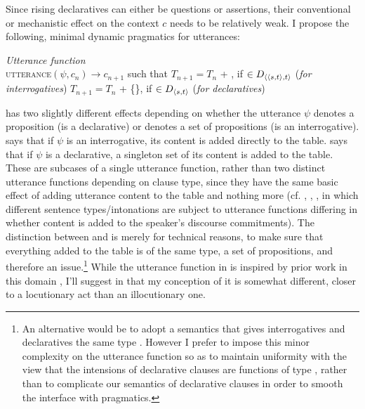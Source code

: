 \documentclass[output=paper,colorlinks,citecolor=brown]{langscibook}
\begin{document}
	Since rising declaratives can either be questions or assertions, their conventional or mechanistic effect on the context $c$ needs to be relatively weak. I propose the following, minimal dynamic pragmatics for utterances:
	
	\exa \emph{Utterance function}\label{dgUtt}\\
	\textsc{utterance}$(\psi, c_n) \rightarrow c_{n+1}$ such that
	\ea $T_{n+1} = T_n$ + , \hspace{1cm} if  $\in D_{{\langle {\langle s,t \rangle},t \rangle}}$ \label{uttI}\hfill (\emph{for interrogatives})
	\ex $T_{n+1} = T_n$ + \{\}, \hspace{.58cm} if  $\in D_{{\langle s,t \rangle}}$  \label{uttD}\hfill (\emph{for declaratives})
	\z
	\z
	
	 has two slightly different effects depending on whether the utterance $\psi$ denotes a proposition (is a declarative) or denotes a set of propositions (is an interrogative).  says that if $\psi$ is an interrogative, its content is added directly to the table.  says that if $\psi$ is a declarative, a singleton set of its content is added to the table. These are subcases of a single utterance function, rather than two distinct utterance functions depending on clause type, since they have  the same basic effect of adding utterance content to the table and nothing more (cf. \citealt{farkas10}, \citealt{jeong18}, \citealt{rudin18}, in which different sentence types/intonations are subject to utterance functions differing in whether content is added to the speaker's discourse commitments). The distinction between  and  is merely for technical reasons, to make sure that everything added to the table is of the same type, a set of propositions, and therefore an issue.\footnote{An alternative would be to adopt a semantics that gives interrogatives and declaratives the same type \citep[cf.][]{farkas17, rudin18, rudin22}. However I prefer to impose this minor complexity on the utterance function so as to maintain uniformity with the view that the intensions of declarative clauses are functions of type , rather than to complicate our semantics of declarative clauses in order to smooth the interface with pragmatics.} While the utterance function in  is inspired by prior work in this domain \citep{farkas10, farkas17, jeong18, rudin18, rudin22}, I'll suggest in  that my conception of it is somewhat different, closer to a locutionary act than an illocutionary one. 
	
\end{document}
